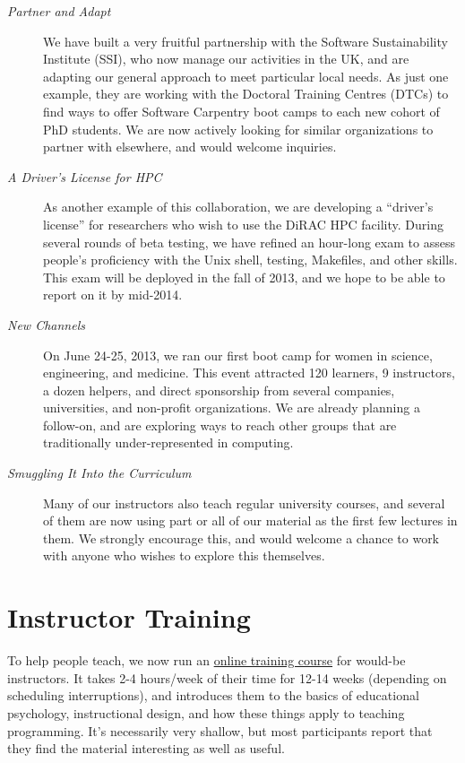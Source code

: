\documentclass[10pt,a4paper,twocolumn]{article}
\begin{document}
\begin{description}
\item[\emph{Partner and Adapt}]
We have built a very fruitful partnership with the Software
Sustainability Institute (SSI), who now manage our activities in the UK,
and are adapting our general approach to meet particular local needs. As
just one example, they are working with the Doctoral Training Centres
(DTCs) to find ways to offer Software Carpentry boot camps to each new
cohort of PhD students. We are now actively looking for similar
organizations to partner with elsewhere, and would welcome inquiries.
\item[\emph{A Driver's License for HPC}]
As another example of this collaboration, we are developing a ``driver's
license'' for researchers who wish to use the DiRAC HPC facility. During
several rounds of beta testing, we have refined an hour-long exam to
assess people's proficiency with the Unix shell, testing, Makefiles, and
other skills. This exam will be deployed in the fall of 2013, and we
hope to be able to report on it by mid-2014.
\item[\emph{New Channels}]
On June 24-25, 2013, we ran our first boot camp for women in science,
engineering, and medicine. This event attracted 120 learners, 9
instructors, a dozen helpers, and direct sponsorship from several
companies, universities, and non-profit organizations. We are already
planning a follow-on, and are exploring ways to reach other groups that
are traditionally under-represented in computing.
\item[\emph{Smuggling It Into the Curriculum}]
Many of our instructors also teach regular university courses, and
several of them are now using part or all of our material as the first
few lectures in them. We strongly encourage this, and would welcome a
chance to work with anyone who wishes to explore this themselves.
\end{description}

\section*{Instructor Training}

To help people teach, we now run an
\href{http://teaching.software-carpentry.org}{online training course}
for would-be instructors. It takes 2-4 hours/week of their time for
12-14 weeks (depending on scheduling interruptions), and introduces them
to the basics of educational psychology, instructional design, and how
these things apply to teaching programming. It's necessarily very
shallow, but most participants report that they find the material
interesting as well as useful.
\end{document}
